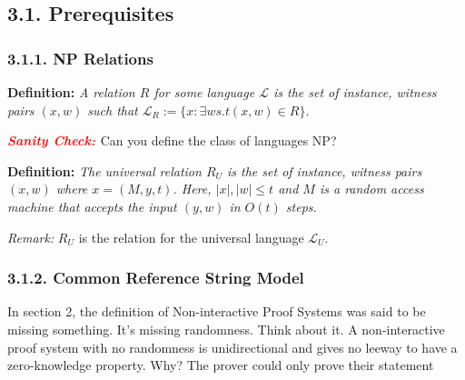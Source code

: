 \documentclass{article}
\newcommand{\scheck}{\textbf{\textit{\textcolor{red}{Sanity Check: }}}}
\begin{document}
\subsection*{3.1. Prerequisites}

\subsubsection*{3.1.1. NP Relations}
\textbf{Definition:} \textit{A relation $R$ for some language $\mathcal{L}$ is the set of instance, witness pairs $(x, w)$ such that $\mathcal{L}_{R} := \{x : \exists w s.t (x, w) \in R\}$}.

\scheck Can you define the class of languages \textsc{NP}?

\textbf{Definition:} \textit{The universal relation $R_U$ is the set of instance, witness pairs $(x, w)$ where $x = (M, y, t)$. Here, $|x|, |w| \leq t$ and $M$ is a random access machine that accepts the input $(y, w)$ in $O(t)$ steps.}

\textit{Remark: } $R_U$ is the relation for the universal language $\mathcal{L}_U$.
\subsubsection*{3.1.2. Common Reference String Model}
In section 2, the definition of Non-interactive Proof Systems was said to be missing something. It's missing randomness. Think about it. A non-interactive proof system with no randomness is unidirectional and gives no leeway to have a zero-knowledge property. Why? The prover could only prove their statement 
\end{document}
